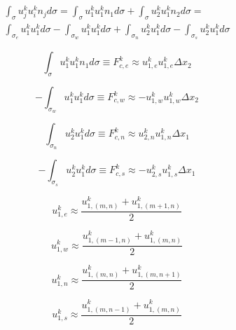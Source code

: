 \documentclass[10pt, letterpaper]{article}
\begin{document}
\begin{multline}
  \int_{\sigma}u_{j}^{k}u_{i}^{k}n_{j}d\sigma = 
  \int_{\sigma}u_{1}^{k}u_{1}^{k}n_{1}d\sigma + \int_{\sigma}u_{2}^{k}u_{1}^{k}n_{2}d\sigma = \\
  \int_{\sigma_{e}}u_{1}^{k}u_{1}^{k}d\sigma - \int_{\sigma_{w}}u_{1}^{k}u_{1}^{k}d\sigma + \int_{\sigma_{n}}u_{2}^{k}u_{1}^{k}d\sigma - \int_{\sigma_{s}}u_{2}^{k}u_{1}^{k}d\sigma
  \label{eq:u1_Fc_int}
\end{multline}

\begin{equation}
  \int_{\sigma}u_{1}^{k}u_{1}^{k}n_{1}d\sigma \equiv
  F_{c,e}^{k} \approx u_{1,e}^{k}u_{1,e}^{k}\Delta{x_{2}}
  \label{eq:u1_Fce}
\end{equation}

\begin{equation}
  - \int_{\sigma_{w}}u_{1}^{k}u_{1}^{k}d\sigma \equiv
  F_{c,w}^{k} \approx -u_{1,w}^{k}u_{1,w}^{k}\Delta{x_{2}}
  \label{eq:u1_Fcw}
\end{equation}

\begin{equation}
  \int_{\sigma_{n}}u_{2}^{k}u_{1}^{k}d\sigma \equiv
  F_{c,n}^{k} \approx u_{2,n}^{k}u_{1,n}^{k}\Delta{x_{1}}
  \label{eq:u1_Fcn}
\end{equation}

\begin{equation}
  - \int_{\sigma_{s}}u_{2}^{k}u_{1}^{k}d\sigma \equiv
  F_{c,s}^{k} \approx -u_{2,s}^{k}u_{1,s}^{k}\Delta{x_{1}}
  \label{eq:u1_Fcs}
\end{equation}

\begin{equation}
  u_{1,e}^{k} \approx \frac{u_{1,(m,n)}^{k} + u_{1,(m+1,n)}^{k}}{2}
  \label{eq:u1_u1e}
\end{equation}

\begin{equation}
  u_{1,w}^{k} \approx \frac{u_{1,(m-1,n)}^{k} + u_{1,(m,n)}^{k}}{2}
  \label{eq:u1_u1w}
\end{equation}

\begin{equation}
  u_{1,n}^{k} \approx \frac{u_{1,(m,n)}^{k} + u_{1,(m,n+1)}^{k}}{2}
  \label{eq:u1_u1n}
\end{equation}

\begin{equation}
  u_{1,s}^{k} \approx \frac{u_{1,(m,n-1)}^{k} + u_{1,(m,n)}^{k}}{2}
  \label{eq:u1_u1s}
\end{equation}
\end{document}
